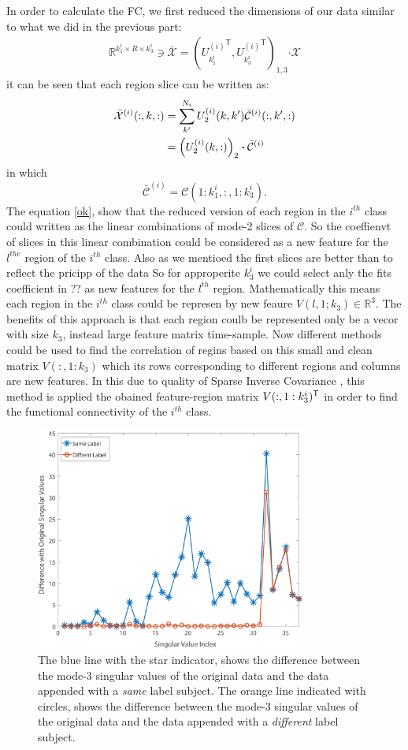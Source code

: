 \documentclass[journal]{IEEEtran}
\newcommand{\trans}{\mathsf{T}}
\begin{document}
{	In order to calculate the FC, we first reduced the dimensions of our data similar to what we did in the previous part: 
	\begin{align}
	\mathbb{R}^{k_1^i \times R \times k_3^i} \ni  \bar{{\mathcal{X}}} = \left( 
	{U_{k_1^i}^{(i)}}^{\trans}, {U_{k^i_3}^{(i)}}^{\trans} 
	\right)_{1,3}\boldsymbol{\cdot} \mathcal{X} \label{DR_Version_FC}
	\end{align}
	it can be seen that each region slice can be written as:
	\begin{align}
	\label{ok}
	\bar{\mathcal{X}}^{(i)}(:,k,:) &= \sum_{k'}^{N_i} U_2^{(i)}(k,k')\bar{\mathcal{C}}^{(i)}(:,k',:) \notag
	\\&= \left( U_{2}^{(i)}(k,:)\right)_2 \boldsymbol{\cdot} \bar{\mathcal{C}}^{(i)}
	\end{align}
	in which 
	\[
	\bar{\mathcal{C}}^{(i)} = \mathcal{C}(1:k_1^i,:,1:k_3^i).
	\]
	The equation \eqref{ok}, show that the reduced version of each region in the $i^{th}$ class could 
	written as the linear combinations of  mode-2 slices of $\mathcal{C}$. So the coeffienvt of slices in this linear combination could be considered as a new feature for the $l^{the}$ region of the $i^{th}$ class. Also as we mentioed the first slices are better than to reflect the pricipp of the data So for approperite $k_3^i$ we could select anly the fits coefficient in ?? as new features for the $l^{th}$ region. Mathematically this means each region  in the $i^{th}$ class could be represen by new feaure $V(l,1;k_3)\in \mathbb{R}^{3}$.   The benefits of this approach is that each
	region coulb be represented only be a vecor with size $k_3$, instead  large feature matrix  time-sample. Now different methods could be used to find the correlation of regins based on this small and clean matrix $V(:,1:k_{3})$ which its rows corresponding to different regions and columns are new features. In this due to quality of  Sparse Inverse Covariance ,  this method is applied the obained  feature-region matrix  $V(:,1:k_3^i)^{\sf T}$  in order to find the functional connectivity of the $i^{th}$ class.
	\begin{figure}[!t]
		\centering
		\includegraphics[width=3.5in]{SVDiff}
		\caption{The blue line with the star indicator, shows the difference between the mode-$3$ singular values of the original data and the data appended with a \emph{same} label subject. The orange line indicated with circles, shows the difference between the mode-$3$ singular values of the original data and the data appended with a \emph{different} label subject.}
		\label{g3.1}
	\end{figure}
}
\end{document}
